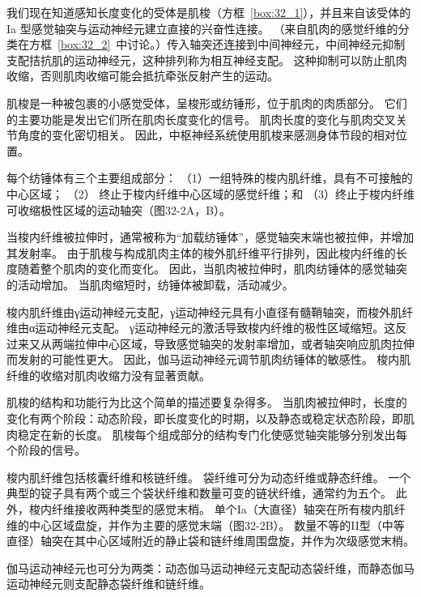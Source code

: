 我们现在知道感知长度变化的受体是肌梭（方框~\ref{box:32_1}），并且来自该受体的 Ia 型感觉轴突与运动神经元建立直接的兴奋性连接。
（来自肌肉的感觉纤维的分类在方框~\ref{box:32_2}~中讨论。）传入轴突还连接到中间神经元，中间神经元抑制支配拮抗肌的运动神经元，这种排列称为相互神经支配。
这种抑制可以防止肌肉收缩，否则肌肉收缩可能会抵抗牵张反射产生的运动。


\begin{proposition}[肌梭] \label{box:32_1}
	
	\quad \quad 肌梭是一种被包裹的小感觉受体，呈梭形或纺锤形，位于肌肉的肉质部分。
	它们的主要功能是发出它们所在肌肉长度变化的信号。
	肌肉长度的变化与肌肉交叉关节角度的变化密切相关。
	因此，中枢神经系统使用肌梭来感测身体节段的相对位置。
	
	\quad \quad 每个纺锤体有三个主要组成部分：
	（1）一组特殊的梭内肌纤维，具有不可接触的中心区域；
	（2） 终止于梭内纤维中心区域的感觉纤维；和
	（3）终止于梭内纤维可收缩极性区域的运动轴突（图32-2A，B）。
	
	\quad \quad 当梭内纤维被拉伸时，通常被称为“加载纺锤体”，感觉轴突末端也被拉伸，并增加其发射率。
	由于肌梭与构成肌肉主体的梭外肌纤维平行排列，因此梭内纤维的长度随着整个肌肉的变化而变化。
	因此，当肌肉被拉伸时，肌肉纺锤体的感觉轴突的活动增加。
	当肌肉缩短时，纺锤体被卸载，活动减少。
	
	\quad \quad 梭内肌纤维由γ运动神经元支配，γ运动神经元具有小直径有髓鞘轴突，而梭外肌纤维由α运动神经元支配。
	γ运动神经元的激活导致梭内纤维的极性区域缩短。这反过来又从两端拉伸中心区域，导致感觉轴突的发射率增加，或者轴突响应肌肉拉伸而发射的可能性更大。
	因此，伽马运动神经元调节肌肉纺锤体的敏感性。
	梭内肌纤维的收缩对肌肉收缩力没有显著贡献。
	
	\quad \quad 肌梭的结构和功能行为比这个简单的描述要复杂得多。
	当肌肉被拉伸时，长度的变化有两个阶段：动态阶段，即长度变化的时期，以及静态或稳定状态阶段，即肌肉稳定在新的长度。
	肌梭每个组成部分的结构专门化使感觉轴突能够分别发出每个阶段的信号。
	
	\quad \quad 梭内肌纤维包括核囊纤维和核链纤维。
	袋纤维可分为动态纤维或静态纤维。
	一个典型的锭子具有两个或三个袋状纤维和数量可变的链状纤维，通常约为五个。
	此外，梭内纤维接收两种类型的感觉末梢。
	单个Ia（大直径）轴突在所有梭内肌纤维的中心区域盘旋，并作为主要的感觉末端（图32-2B）。
	数量不等的II型（中等直径）轴突在其中心区域附近的静止袋和链纤维周围盘旋，并作为次级感觉末梢。
	
	\quad \quad 伽马运动神经元也可分为两类：动态伽马运动神经元支配动态袋纤维，而静态伽马运动神经元则支配静态袋纤维和链纤维。
	

\end{proposition}

